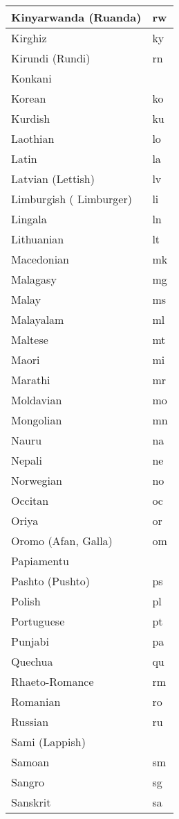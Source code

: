 \begin{longtable}{|l|l|}
\hline
Kinyarwanda (Ruanda)	&rw\\
\hline
Kirghiz				&ky\\
\hline
Kirundi (Rundi)			&	rn\\
\hline
Konkani	 			&\\
\hline
Korean				&	ko\\
\hline
Kurdish				&ku\\
\hline
Laothian				&lo\\
\hline
Latin				&la\\
\hline
Latvian (Lettish)		&lv\\
\hline
Limburgish ( Limburger)	&	li\\
\hline
Lingala				&ln\\
\hline
Lithuanian			&	lt\\
\hline
Macedonian			&mk\\
\hline
Malagasy				&mg\\
\hline
Malay				&ms\\
\hline
Malayalam			&	ml\\
\hline
Maltese				&mt\\
\hline
Maori				&mi\\
\hline
Marathi				&mr\\
\hline
Moldavian			&	mo\\
\hline
Mongolian			&	mn\\
\hline
Nauru				&na\\
\hline
Nepali				&ne\\
\hline
Norwegian			&no\\
\hline
Occitan				&oc\\
\hline
Oriya				&or\\
\hline
Oromo (Afan, Galla)	&om\\
\hline
Papiamentu			 &\\
\hline
Pashto (Pushto)		&ps\\
\hline
Polish				&pl\\
\hline
Portuguese			&	pt\\
\hline
Punjabi				&pa\\
\hline
Quechua				&qu\\
\hline
Rhaeto-Romance		&rm\\
\hline
Romanian				&ro\\
\hline
Russian				&ru\\
\hline
Sami (Lappish)	 		&\\
\hline
Samoan				&sm\\
\hline
Sangro				&sg\\
\hline
Sanskrit				&sa\\

\end{longtable}
